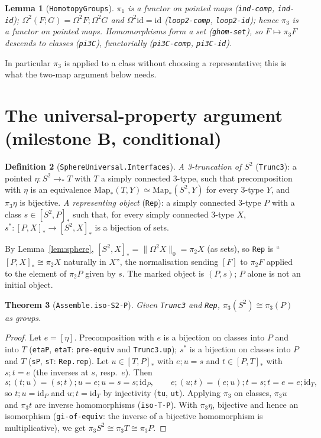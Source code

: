 \documentclass[11pt]{amsart}
\newtheorem{theorem}{Theorem}
\newtheorem{lemma}[theorem]{Lemma}
\theoremstyle{definition}
\newtheorem{definition}[theorem]{Definition}
\theoremstyle{remark}
\newcommand{\Om}{\Omega}
\newcommand{\Map}{\mathrm{Map}_*}
\newcommand{\cls}[1]{[#1]}
\newcommand{\hc}[2]{[#1,#2]_*}
\newcommand{\code}[1]{\texttt{#1}}
\begin{document}
\begin{lemma}[\code{HomotopyGroups}]
$\pi_1$ is a functor on pointed maps (\code{ind-comp}, \code{ind-id});
$\Om^2(F;G)=\Om^2F;\Om^2G$ and $\Om^2\mathrm{id}=\mathrm{id}$
(\code{loop2-comp}, \code{loop2-id}); hence $\pi_3$ is a functor on
pointed maps. Homomorphisms form a set (\code{ghom-set}), so
$F\mapsto\pi_3F$ descends to classes (\code{pi3C}), functorially
(\code{pi3C-comp}, \code{pi3C-id}).
\end{lemma}
In particular $\pi_3$ is applied to a class without choosing a
representative; this is what the two-map argument below needs.

\section{The universal-property argument (milestone B, conditional)}

\begin{definition}[\code{SphereUniversal.Interfaces}]
\emph{A 3-truncation of $S^2$} (\code{Trunc3}): a pointed
$\eta:S^2\to_*T$ with $T$ a simply connected 3-type, such that
precomposition with $\eta$ is an equivalence $\Map(T,Y)\simeq\Map(S^2,Y)$
for every 3-type $Y$, and $\pi_3\eta$ is bijective.
\emph{A representing object} (\code{Rep}): a simply connected 3-type $P$
with a class $s\in\hc{S^2}P$ such that, for every simply connected
3-type $X$, $s^*:\hc PX\to\hc{S^2}X$ is a bijection of sets.
\end{definition}

By Lemma~\ref{lem:sphere}, $\hc{S^2}X=\|\Om^2X\|_0=\pi_2X$ (as sets), so
\code{Rep} is ``$\hc PX\cong\pi_2X$ naturally in $X$'', the normalisation
sending $\cls F$ to $\pi_2F$ applied to the element of $\pi_2P$ given by
$s$. The marked object is $(P,s)$; $P$ alone is not an initial object.

\begin{theorem}[\code{Assemble.iso-S2-P}]\label{thm:B}
Given \code{Trunc3} and \code{Rep}, $\pi_3(S^2)\cong\pi_3(P)$ as groups.
\end{theorem}
\begin{proof}
Let $e=\cls\eta$. Precomposition with $e$ is a bijection on classes into
$P$ and into $T$ (\code{etaP}, \code{etaT}: \code{pre-equiv} and
\code{Trunc3.up}); $s^*$ is a bijection on classes into $P$ and $T$
(\code{sP}, \code{sT}: \code{Rep.rep}). Let $u\in\hc TP$ with $e;u=s$
and $t\in\hc PT$ with $s;t=e$ (the inverses at $s$, resp.\ $e$). Then
\[ s;(t;u)=(s;t);u=e;u=s=s;\mathrm{id}_P,\qquad
   e;(u;t)=(e;u);t=s;t=e=e;\mathrm{id}_T,\]
so $t;u=\mathrm{id}_P$ and $u;t=\mathrm{id}_T$ by injectivity
(\code{tu}, \code{ut}). Applying $\pi_3$ on classes, $\pi_3u$ and
$\pi_3t$ are inverse homomorphisms (\code{iso-T-P}). With
$\pi_3\eta$, bijective and hence an isomorphism (\code{gi-of-equiv}:
the inverse of a bijective homomorphism is multiplicative), we get
$\pi_3S^2\cong\pi_3T\cong\pi_3P$.
\end{proof}
\end{document}

